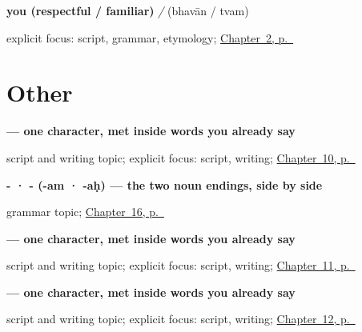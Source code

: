 \noindent\begin{minipage}[t]{\linewidth}
\raggedright
\textbf{you (respectful / familiar)}\enspace\emph{ / }\enspace(bhavān / tvam)\par
\footnotesize explicit focus: script, grammar, etymology; \hyperref[ch:introductions]{Chapter~2, p.~\pageref*{ch:introductions}}
\end{minipage}\par\smallskip

\section*{Other}

\noindent\begin{minipage}[t]{\linewidth}
\raggedright
\textbf{ — one character, met inside words you already say}\par
\footnotesize script and writing topic; explicit focus: script, writing; \hyperref[ch:sa-request-nouns]{Chapter~10, p.~\pageref*{ch:sa-request-nouns}}
\end{minipage}\par\smallskip

\noindent\begin{minipage}[t]{\linewidth}
\raggedright
\textbf{- · - (-am · -aḥ) — the two noun endings, side by side}\par
\footnotesize grammar topic; \hyperref[ch:sa-places]{Chapter~16, p.~\pageref*{ch:sa-places}}
\end{minipage}\par\smallskip

\noindent\begin{minipage}[t]{\linewidth}
\raggedright
\textbf{ — one character, met inside words you already say}\par
\footnotesize script and writing topic; explicit focus: script, writing; \hyperref[ch:sa-people-nouns]{Chapter~11, p.~\pageref*{ch:sa-people-nouns}}
\end{minipage}\par\smallskip

\noindent\begin{minipage}[t]{\linewidth}
\raggedright
\textbf{ — one character, met inside words you already say}\par
\footnotesize script and writing topic; explicit focus: script, writing; \hyperref[ch:sa-face-nouns-1]{Chapter~12, p.~\pageref*{ch:sa-face-nouns-1}}
\end{minipage}\par\smallskip


